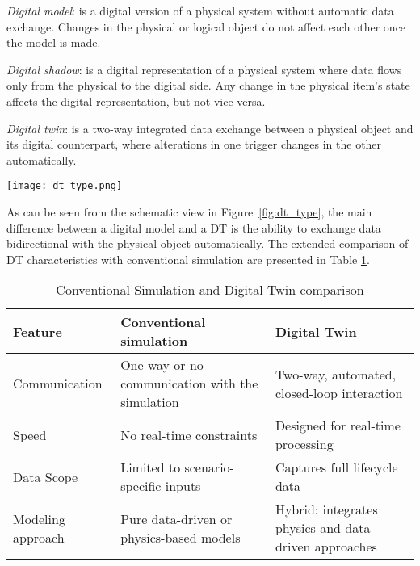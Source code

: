 \textit{Digital model}: is a digital version of a physical system without automatic data exchange. Changes in the physical or logical object do not affect each other once the model is made.

\textit{Digital shadow}: is a digital representation of a physical system where data flows only from the physical to the digital side. Any change in the physical item's state affects the digital representation, but not vice versa.

\textit{Digital twin}: is a two-way integrated data exchange between a physical object and its digital counterpart, where alterations in one trigger changes in the other automatically.

\begin{figure*}[htbp]
    \centering
    \texttt{[image: dt\_type.png]}
    \caption{Digital twin definition classification.}
    \label{fig:dt_type}
\end{figure*}

As can be seen from the schematic view in Figure~\cref{fig:dt_type}, the main difference between a digital model and a DT is the ability to exchange data bidirectional with the physical object automatically. The extended comparison of DT characteristics with conventional simulation are presented in Table \ref{tab:dt_vs_sim}.

\begin{table}[h]
    \centering
    \caption{Conventional Simulation and Digital Twin comparison}
    \begin{tabular}{|>{\centering\arraybackslash}m{3.4cm}|>{\centering\arraybackslash}m{5cm}|>{\centering\arraybackslash}m{5cm}|}
    \hline
    \textbf{Feature} & \textbf{Conventional simulation} & \textbf{Digital Twin} \\ \hline
    Communication & One-way or no communication with the simulation & Two-way, automated, closed-loop interaction \\ \hline
    Speed & No real-time constraints & Designed for real-time processing \\ \hline
    Data Scope & Limited to scenario-specific inputs & Captures full lifecycle data \\ \hline
    Modeling approach & Pure data-driven or physics-based models & Hybrid: integrates physics and data-driven approaches \\ \hline
    \end{tabular}
    \label{tab:dt_vs_sim}
\end{table}

